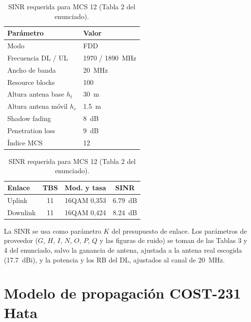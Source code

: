 \documentclass[11pt,letterpaper]{article}
\begin{document}
\begin{table}[H]
\centering
\begin{minipage}[t]{0.47\textwidth}
\centering
\caption{Parámetros de la estación tipo 3.}
\label{tab:param}
\begin{tabular}{@{}ll@{}}
\toprule
\textbf{Parámetro} & \textbf{Valor} \\
\midrule
Modo & FDD \\
Frecuencia DL / UL & \SI{1970}{} / \SI{1890}{MHz} \\
Ancho de banda & \SI{20}{MHz} \\
Resource blocks & 100 \\
Altura antena base $h_t$ & \SI{30}{m} \\
Altura antena móvil $h_r$ & \SI{1.5}{m} \\
Shadow fading & \SI{8}{dB} \\
Penetration loss & \SI{9}{dB} \\
Índice MCS & 12 \\
\bottomrule
\end{tabular}
\end{minipage}\hfill
\begin{minipage}[t]{0.49\textwidth}
\centering
\caption{SINR requerida para MCS 12 (Tabla 2 del enunciado).}
\label{tab:mcs}
\begin{tabular}{@{}lccc@{}}
\toprule
\textbf{Enlace} & \textbf{TBS} & \textbf{Mod. y tasa} & \textbf{SINR} \\
\midrule
Uplink & 11 & 16QAM 0,353 & \SI{6.79}{dB} \\
Downlink & 11 & 16QAM 0,424 & \SI{8.24}{dB} \\
\bottomrule
\end{tabular}
\vspace{0.3cm}

\small La SINR se usa como parámetro $K$ del presupuesto de enlace. Los parámetros de proveedor ($G$, $H$, $I$, $N$, $O$, $P$, $Q$ y las figuras de ruido) se toman de las Tablas 3 y 4 del enunciado, salvo la ganancia de antena, ajustada a la antena real escogida (\SI{17.7}{dBi}), y la potencia y los RB del DL, ajustados al canal de \SI{20}{MHz}.
\end{minipage}
\end{table}

\section{Modelo de propagación COST-231 Hata}
\end{document}

